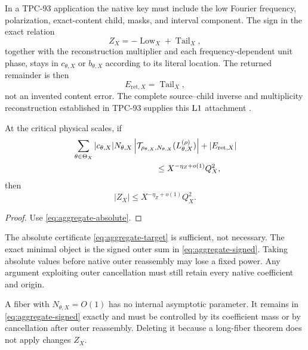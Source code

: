 \begin{remark}
\label{rem:tpc93-convention}
In a TPC-93 application the native key must include the low Fourier
frequency, polarization, exact-content child, masks, and interval
component.  The sign in the exact relation
\[
 Z_X=-\operatorname{Low}_X+\operatorname{Tail}_X,
\]
together with the reconstruction multiplier and each
frequency-dependent unit phase, stays in \(c_{\theta,X}\) or
\(b_{\theta,X}\) according to its literal location.  The returned
remainder is then
\[
 E_{\mathrm{ret},X}=\operatorname{Tail}_X,
\]
not an invented content error.  The complete source--child inverse
and multiplicity reconstruction established in TPC-93 supplies this
\(\mathrm{L1}\) attachment \citep{WangTPC93}.
\end{remark}

\begin{corollary}
\label{cor:zero-mode-certificate}
At the critical physical scales, if
\begin{align}
 &\sum_{\theta\in\Theta_X}
 |c_{\theta,X}|N_{\theta,X}
 \left|
 \cT_{\rho_{\theta,X},N_{\theta,X}}
 (L_{\theta,X}^{(\rho)})
 \right|
 +|E_{\mathrm{ret},X}|
 \notag\\
 &\hspace{35mm}\le
 X^{-\eta_Z+o(1)}Q_X^2,
\label{eq:aggregate-target}
\end{align}
then
\[
 |Z_X|\le X^{-\eta_Z+o(1)}Q_X^2.
\]
\end{corollary}

\begin{proof}
Use \eqref{eq:aggregate-absolute}.
\end{proof}

\begin{remark}
\label{rem:signed-minimal}
The absolute certificate \eqref{eq:aggregate-target} is sufficient,
not necessary.  The exact minimal object is the signed outer sum in
\eqref{eq:aggregate-signed}.  Taking absolute values before native
outer reassembly may lose a fixed power.  Any argument exploiting
outer cancellation must still retain every native coefficient and
origin.
\end{remark}

\begin{remark}
\label{rem:bounded-fibers}
A fiber with \(N_{\theta,X}=O(1)\) has no internal asymptotic
parameter.  It remains in \eqref{eq:aggregate-signed} exactly and
must be controlled by its coefficient mass or by cancellation after
outer reassembly.  Deleting it because a long-fiber theorem does not
apply changes \(Z_X\).
\end{remark}

